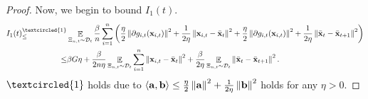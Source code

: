 \documentclass{article}
\begin{document}
\begin{proof}
Now, we begin to bound $I_1(t)$.
\begin{align}
\nonumber
I_1(t) \refabovecir{\le}{\textcircled{1}} & \EE_{ \Xi_{n,t} \sim \Dcal_{t} }\frac{\beta}{n}\sum_{i=1}^n \lrincir{ \frac{\eta}{2}\lrnorm{\partial g_{i,t}(\x_{i,t})}^2 + \frac{1}{2\eta}\lrnorm{\x_{i,t} - \bar{\x}_t}^2  + \frac{\eta}{2}\lrnorm{\partial g_{i,t}(\x_{i,t})}^2 + \frac{1}{2\eta}\lrnorm{\bar{\x}_t - \bar{\x}_{t+1}}^2 }\\ \nonumber
\le & \beta G \eta + \frac{\beta}{2n\eta } \EE_{ \Xi_{n,t} \sim \Dcal_{t} } \sum_{i=1}^n \lrnorm{\x_{i,t} - \bar{\x}_t}^2 + \frac{\beta }{2\eta }\EE_{ \Xi_{n,t} \sim \Dcal_{t} } \lrnorm{\bar{\x}_t - \bar{\x}_{t+1}}^2.
\end{align} $\textcircled{1}$ holds due to $\left\langle{\bf a},{\bf b} \right\rangle \le \frac{\eta}{2}\left\lVert{\bf a}\right\rVert^2 + \frac{1}{2\eta}\left\lVert{\bf b}\right\rVert^2$ holds for any $\eta>0$. 


\end{proof}
\end{document}
